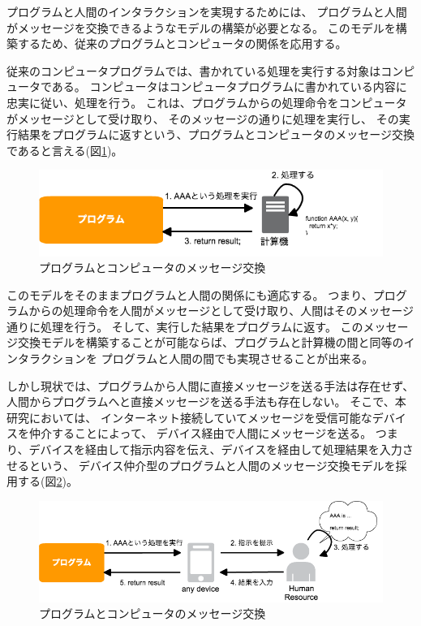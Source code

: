 プログラムと人間のインタラクションを実現するためには、
プログラムと人間がメッセージを交換できるようなモデルの構築が必要となる。
このモデルを構築するため、従来のプログラムとコンピュータの関係を応用する。

従来のコンピュータプログラムでは、書かれている処理を実行する対象はコンピュータである。
コンピュータはコンピュータプログラムに書かれている内容に忠実に従い、処理を行う。
これは、プログラムからの処理命令をコンピュータがメッセージとして受け取り、
そのメッセージの通りに処理を実行し、
その実行結果をプログラムに返すという、プログラムとコンピュータのメッセージ交換であると言える(図\ref{fig:program-machine-model})。

\begin{figure}[htbp]
  \begin{center}
  \includegraphics[width=.7\linewidth,bb=0 0 659 165]{images/program-machine-model.png}
  \end{center}
  \caption{プログラムとコンピュータのメッセージ交換}
  \label{fig:program-machine-model}
\end{figure}

このモデルをそのままプログラムと人間の関係にも適応する。
つまり、プログラムからの処理命令を人間がメッセージとして受け取り、人間はそのメッセージ通りに処理を行う。
そして、実行した結果をプログラムに返す。
このメッセージ交換モデルを構築することが可能ならば、プログラムと計算機の間と同等のインタラクションを
プログラムと人間の間でも実現させることが出来る。

しかし現状では、プログラムから人間に直接メッセージを送る手法は存在せず、
人間からプログラムへと直接メッセージを送る手法も存在しない。
そこで、本研究においては、
インターネット接続していてメッセージを受信可能なデバイスを仲介することによって、
デバイス経由で人間にメッセージを送る。
つまり、デバイスを経由して指示内容を伝え、デバイスを経由して処理結果を入力させるという、
デバイス仲介型のプログラムと人間のメッセージ交換モデルを採用する(図\ref{fig:program-device-human-model})。

\begin{figure}[htbp]
  \begin{center}
  \includegraphics[width=.7\linewidth,bb=0 0 790 233]{images/program-device-human-model.png}
  \end{center}
  \caption{プログラムとコンピュータのメッセージ交換}
  \label{fig:program-device-human-model}
\end{figure}

